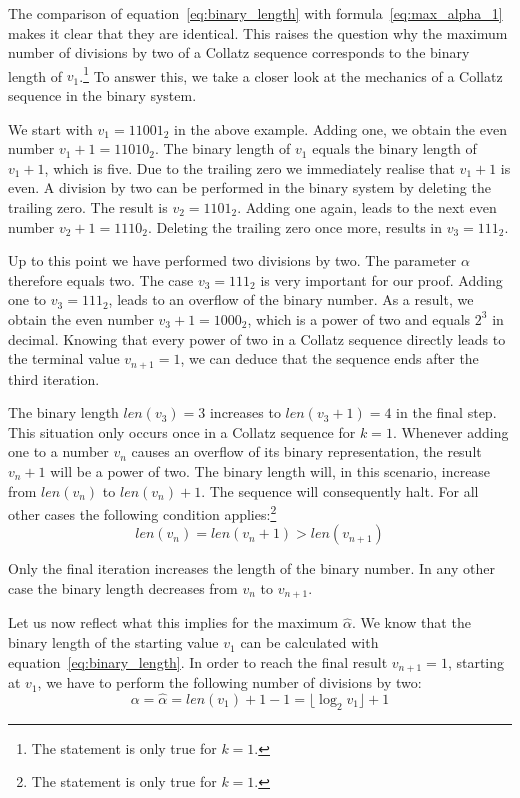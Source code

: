 \documentclass{SciPress_2015}
\begin{document}
The comparison of equation~\ref{eq:binary_length} with formula~\ref{eq:max_alpha_1} makes it clear that they are identical. This raises the question why the maximum number of divisions by two of a Collatz sequence corresponds to the binary length of $v_1$.\footnote{The statement is only true for $k=1$.} To answer this, we take a closer look at the mechanics of a Collatz sequence in the binary system.

\par\medskip
We start with $v_1=11001_2$ in the above example. Adding one, we obtain the even number $v_1+1=11010_2$. The binary length of $v_1$ equals the binary length of $v_1+1$, which is five. Due to the trailing zero we immediately realise that $v_1+1$ is even. A division by two can be performed in the binary system by deleting the trailing zero. The result is $v_2=1101_2$. Adding one again, leads to the next even number $v_2+1=1110_2$. Deleting the trailing zero once more, results in $v_3=111_2$.

\par\medskip
Up to this point we have performed two divisions by two. The parameter $\alpha$ therefore equals two. The case $v_3=111_2$ is very important for our proof. Adding one to $v_3=111_2$, leads to an overflow of the binary number. As a result, we obtain the even number $v_3+1=1000_2$, which is a power of two and equals $2^3$ in decimal. Knowing that every power of two in a Collatz sequence directly leads to the terminal value $v_{n+1}=1$, we can deduce that the sequence ends after the third iteration.

\par\medskip
The binary length $len(v_3)=3$ increases to $len(v_3+1)=4$ in the final step. This situation only occurs once in a Collatz sequence for $k=1$. Whenever adding one to a number $v_n$ causes an overflow of its binary representation, the result $v_n+1$ will be a power of two. The binary length will, in this scenario, increase from $len(v_n)$ to $len(v_n)+1$. The sequence will consequently halt. For all other cases the following condition applies:\footnote{The statement is only true for $k=1$.}
\[
	len(v_n)=len(v_n+1)>len(v_{n+1})
\]

Only the final iteration increases the length of the binary number. In any other case the binary length decreases from $v_n$ to $v_{n+1}$.

\par\medskip
Let us now reflect what this implies for the maximum $\hat\alpha$. We know that the binary length of the starting value $v_1$ can be calculated with equation~\ref{eq:binary_length}. In order to reach the final result $v_{n+1}=1$, starting at $v_1$, we have to perform the following number of divisions by two:
\begin{equation}
	\alpha=\hat\alpha=len(v_1)+1-1=\lfloor\log_2 v_1\rfloor+1
\end{equation}
\end{document}
